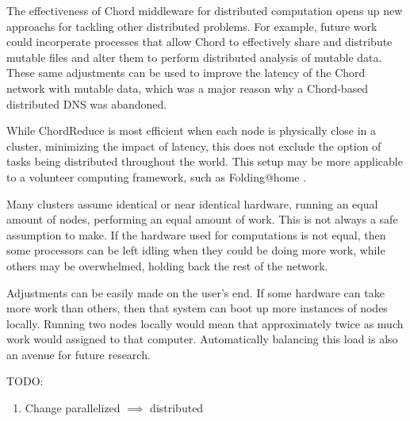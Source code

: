 \documentclass[10pt, conference, compsocconf]{IEEEtran}
\begin{document}
 
The effectiveness of Chord middleware for distributed computation opens up new approachs for tackling other distributed problems. For example, future work could incorperate processes that allow Chord to effectively share and distribute mutable files \cite{IRM} and alter them to perform distributed analysis of mutable data.  These same adjustments can be used to improve the latency of the Chord network with mutable data, which was a major reason why a Chord-based distributed DNS \cite{cox2002serving} was abandoned.  

While ChordReduce is most efficient when each node is physically close in a cluster, minimizing the impact of latency, this does not exclude the option of tasks being distributed throughout the world.  This setup may be more applicable to a volunteer computing framework, such as Folding@home \cite{folding}.

Many clusters assume identical or near identical hardware, running an equal amount of nodes, performing an equal amount of work. This is not always a safe assumption to make.  If the hardware used for computations is not equal, then some processors can be left idling when they could be doing more work, while others may be overwhelmed, holding back the rest of the network.

Adjustments can be easily made on the user's end.  If some hardware can take more work than others, then that system can boot up more instances of nodes locally. Running two nodes locally would mean that approximately twice as much work would assigned to that computer.  Automatically balancing this load is also an avenue for future research.




TODO:
\begin{enumerate}
    \item Change parallelized  $\implies$ distributed
\end{enumerate}





\end{document}
